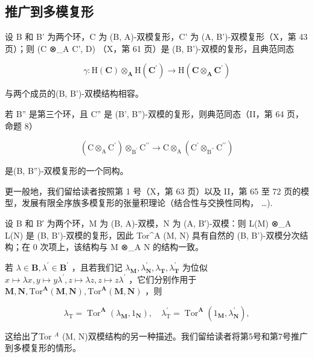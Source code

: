 \subsection{推广到多模复形}

设 B 和 B' 为两个环，C 为 (B, A)-双模复形，C' 为 (A, B')-双模复形（X，第 43 页）；则 (C ⊗\_A C', D) （X，第 61 页）是 (B, B')-双模的复形，且典范同态

\[
\gamma : \mathrm{H} (\mathbf {C}) \otimes_ {\mathbf {A}} \mathrm{H} (\mathbf {C} ^ {\prime}) \rightarrow \mathrm{H} (\mathbf {C} \otimes_ {\mathbf {A}} \mathbf {C} ^ {\prime})
\]

与两个成员的(B, B')-双模结构相容。

若 B'' 是第三个环，且 C'' 是 (B', B'')-双模的复形，则典范同态（II，第 64 页，命题 8）

\[
\left(\mathrm{C} \otimes_ {\mathrm{A}} \mathrm{C} ^ {\prime}\right) \otimes_ {\mathrm{B} ^ {\prime}} \mathrm{C} ^ {\prime \prime} \rightarrow \mathrm{C} \otimes_ {\mathrm{A}} \left(\mathrm{C} ^ {\prime} \otimes_ {\mathrm{B} ^ {\prime \prime}} \mathrm{C} ^ {\prime \prime}\right)
\]

是(B, B'')-双模复形的一个同构。

更一般地，我们留给读者按照第 1 号（X，第 63 页）以及 II，第 65 至 72 页的模型，发展有限全序族多模复形的张量积理论（结合性与交换性同构， \ldots).

设 B 和 B′ 为两个环，M 为 (B, A)-双模，N 为 (A, B′)-双模：则 L(M) ⊗\_A L(N) 是 (B, B')-双模的复形，因此 Tor\^{}A (M, N) 具有自然的 (B, B')-双模分次结构；在 0 次项上，该结构与 M ⊗\_A N 的结构一致。

若 \(\lambda\in\mathbf{B},\lambda^{\prime}\in\mathbf{B}^{\prime}\) ，且若我们记 \(\lambda_{\mathbf{M}},\lambda_{\mathbf{N}}^{\prime},\lambda_{\mathbf{T}},\lambda_{\mathbf{T}}^{\prime}\) 为位似 \(x\mapsto\lambda x,y\mapsto y\lambda^{\prime},z\mapsto\lambda z,z\mapsto z\lambda^{\prime}\) ，它们分别作用于 \(\mathbf{M},\mathbf{N},\mathrm{Tor}^{\mathbf{A}}(\mathbf{M},\mathbf{N}),\mathrm{Tor}^{\mathbf{A}}(\mathbf{M},\mathbf{N})\) ，则

\[
\lambda_ {\mathrm{T}} = \operatorname{Tor} ^ {\mathbf {A}} \left(\lambda_ {\mathbf {M}}, 1 _ {\mathbf {N}}\right), \quad \lambda_ {\mathrm{T}} ^ {\prime} = \operatorname{Tor} ^ {\mathbf {A}} \left(1 _ {\mathbf {M}}, \lambda_ {\mathbf {N}} ^ {\prime}\right),
\]

这给出了Tor \(^{A}\) (M, N)双模结构的另一种描述。我们留给读者将第5号和第7号推广到多模复形的情形。

